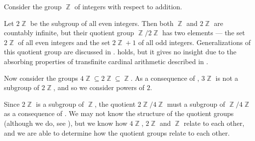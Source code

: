 \begin{example}\label{ex:subgroups_of_integers}
  Consider the group \( \BbbZ \) of integers with respect to addition.

  Let \( 2\BbbZ \) be the subgroup of all even integers. Then both \( \BbbZ \) and \( 2\BbbZ \) are countably infinite, but their quotient group \( \BbbZ / 2\BbbZ \) has two elements --- the set \( 2\BbbZ \) of all even integers and the set \( 2\BbbZ + 1 \) of all odd integers. Generalizations of this quotient group are discussed in .  holds, but it gives no insight due to the absorbing properties of transfinite cardinal arithmetic described in .

  Now consider the groups \( 4\BbbZ \subseteq 2\BbbZ \subseteq \BbbZ \). As a consequence of , \( 3\BbbZ \) is not a subgroup of \( 2\BbbZ \), and so we consider powers of \( 2 \).

  Since \( 2\BbbZ \) is a subgroup of \( \BbbZ \), the quotient \( 2\BbbZ / 4\BbbZ \) must a subgroup of \( \BbbZ / 4\BbbZ \) as a consequence of . We may not know the structure of the quotient groups (although we do, see ), but we know how \( 4\BbbZ \), \( 2\BbbZ \) and \( \BbbZ \) relate to each other, and we are able to determine how the quotient groups relate to each other.
\end{example}

